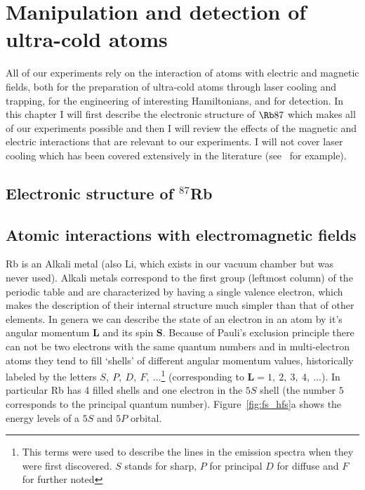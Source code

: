 
\renewcommand{\thechapter}{4}

\chapter{Manipulation and detection of ultra-cold atoms}

All of our experiments rely on the interaction of atoms with electric and magnetic fields, both for the preparation of ultra-cold atoms through laser cooling and trapping, for the engineering of interesting Hamiltonians, and for detection. In this chapter I will first describe the electronic structure of $\Rb87$ which makes all of our experiments possible and then I will review the effects of the magnetic and electric interactions that are relevant to our experiments. I will not cover laser cooling which has been covered extensively in the literature (see~\cite{metcalf_deceleration_1999} for example). 

\section{Electronic structure of $^{87}$Rb}



\section{Atomic interactions with electromagnetic fields}

Rb is an Alkali metal (also Li, which exists in our vacuum chamber but was never used). Alkali metals correspond to the first group (leftmost column) of the periodic table and are characterized by having a single valence electron, which makes the description of their internal structure much simpler than that of other elements. In genera we can describe the state of an electron in an atom by it's angular momentum $\mathbf L$ and its spin $\mathbf{S}$. Because of Pauli's exclusion principle there can not be two electrons with the same quantum numbers and in multi-electron atoms they tend to fill `shells' of different angular momentum values, historically labeled by the letters $S,\ P,\ D,\ F,\ ...$\footnote{This terms were used to describe the lines in the emission spectra when they were first discovered. $S$ stands for sharp, $P$ for principal $D$ for diffuse and $F$ for further noted} (corresponding to $\mathbf{L}=1,\ 2,\ 3,\ 4,\ ...$). In particular Rb has 4 filled shells and one electron in the $5S$ 
shell (the number $5$ corresponds to the principal quantum number). Figure~\ref{fig:fs_hfs}a shows the energy levels of a $5S$ and $5P$ orbital.

